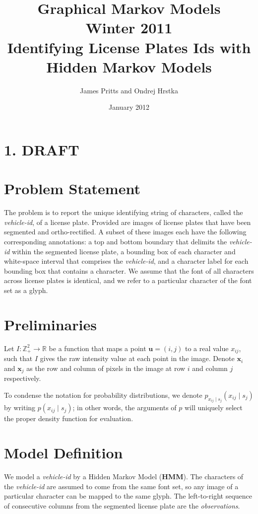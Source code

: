\documentclass[a4paper,12pt]{article}
\title { \normalsize Graphical Markov Models \\ Winter 2011 \\
 \vspace{10mm} {\bf Identifying License Plates Ids with Hidden Markov
    Models } }
\author{\normalsize James Pritts and Ondrej Hrstka }
\date{ \small January 2012 }
\begin{document}
\maketitle

\pagestyle{empty} 
\section*{1. DRAFT}
\section{Problem Statement}
The problem is to report the unique identifying string of characters,
called the \emph{vehicle-id}, of a license plate.  Provided are images
of license plates that have been segmented and ortho-rectified. A
subset of these images each have the following corresponding
annotations: a top and bottom boundary that delimits the
\emph{vehicle-id} within the segmented license plate, a bounding box
of each character and white-space interval that comprises the
\emph{vehicle-id}, and a character label for each bounding box that
contains a character.  We assume that the font of all characters
across license plates is identical, and we refer to a particular
character of the font set as a glyph.

\section{Preliminaries}
Let $I\colon \mathbb{Z}^2_+ \to \mathbb{R}$ be a function that maps a
point $\mathbf{u} = (i,j)$ to a real value $x_{ij}$, such that $I$
gives the raw intensity value at each point in the image.  Denote
$\mathbf{x}_i$ and $\mathbf{x}_j$ as the row and column of pixels in
the image at row $i$ and column $j$ respectively.

To condense the notation for probability distributions, we denote
$p_{x_{ij} \mid s_j}(x_{ij} \mid s_j)$ by writing $p(x_{ij} \mid
s_j)$; in other words, the arguments of $p$ will uniquely select the
proper density function for evaluation.

\section{Model Definition}
We model a \emph{vehicle-id} by a Hidden Markov Model (\textbf{HMM}).
The characters of the \emph{vehicle-id} are assumed to come from the
same font set, so any image of a particular character can be mapped to
the same glyph.  The left-to-right sequence of consecutive columns
from the segmented license plate are the \emph{observations}.
\end{document}
